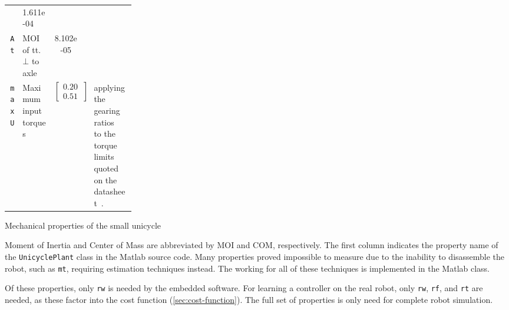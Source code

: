 {\begin{tabularx}{\linewidth}{
	@{}
	r
	>{\raggedright}p{0.25\linewidth}
	S[
		scientific-notation = engineering,
		table-format=-3e-1,
		table-auto-round
	]
	s
	X
	@{}
}
		& 1.611e-04 & \kilogram \square\meter
		&
	\\
	\texttt{At}
		& MOI of tt. $\bot$ to axle
		& 8.102e-05 & \kilogram \square\meter
		& 
	\\
\midrule
	\texttt{maxU}
		& Maximum input torques
		& {
			\renewcommand{\arraystretch}{1}
			$\begin{bmatrix}0.205 \\ 0.513\end{bmatrix}$
		} & \newton \meter
		& applying the gearing ratios~\cite{gearbox} to the torque limits quoted on the datasheet~\cite{motor}.
	\\
\bottomrule
\end{tabularx}
}

\centering
\caption{Mechanical properties of the small unicycle}
\medskip
\small
Moment of Inertia and Center of Mass are abbreviated by MOI and COM, respectively.
The first column indicates the property name of the \texttt{UnicyclePlant} class in the Matlab source code.
Many properties proved impossible to measure due to the inability to disassemble the robot, such as \texttt{mt}, requiring estimation techniques instead.
The working for all of these techniques is implemented in the Matlab  class.

\medskip
Of these properties, only \texttt{rw} is needed by the embedded software.
For learning a controller on the real robot, only \texttt{rw}, \texttt{rf}, and \texttt{rt} are needed, as these factor into the cost function (\cref{sec:cost-function}).
The full set of properties is only need for complete robot simulation.

